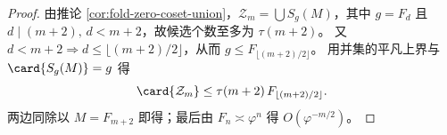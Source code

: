 \begin{proof}
由推论 \ref{cor:fold-zero-coset-union}，\(\mathcal{Z}_m=\bigcup S_{g}(M)\)，其中 \(g=F_d\) 且 \(d\mid(m+2),\,d<m+2\)，故候选个数至多为 \(\tau(m+2)\)。
又 \(d<m+2\Rightarrow d\le \lfloor (m+2)/2\rfloor\)，从而 \(g\le F_{\lfloor (m+2)/2\rfloor}\)。
用并集的平凡上界与 \(\card{S_g(M)}=g\) 得
\[
\card{\mathcal{Z}_m}\le \tau(m+2)\,F_{\lfloor (m+2)/2\rfloor}.
\]
两边同除以 \(M=F_{m+2}\) 即得；最后由 \(F_n\asymp \varphi^n\) 得 \(O(\varphi^{-m/2})\)。
\end{proof}
